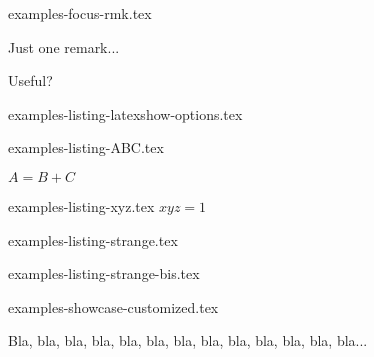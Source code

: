 \begin{filecontents*}[overwrite]{examples-focus-rmk.tex}
\begin{tdocrem}
    Just one remark...
\end{tdocrem}

\begin{tdocrem}
    Useful?
\end{tdocrem}
\end{filecontents*}


\begin{filecontents*}[overwrite]{examples-listing-latexshow-options.tex}
\end{filecontents*}


\begin{filecontents*}[overwrite]{examples-listing-ABC.tex}
\begin{tdoclatex}[sbs]
    $A = B + C$
\end{tdoclatex}
\end{filecontents*}


\begin{filecontents*}[overwrite]{examples-listing-xyz.tex}
$x y z = 1$
\end{filecontents*}


\begin{filecontents*}[overwrite]{examples-listing-strange.tex}
\begin{tdoclatex}
\end{tdoclatex}
\end{filecontents*}


\begin{filecontents*}[overwrite]{examples-listing-strange-bis.tex}
\begin{tdoclatex}
\end{tdoclatex}
\end{filecontents*}


\begin{filecontents*}[overwrite]{examples-showcase-customized.tex}
\begin{tdocshowcase}[before = My beginning,
                     after  = My end,
                     color  = red]
    Bla, bla, bla, bla, bla, bla, bla, bla, bla, bla, bla, bla, bla...
\end{tdocshowcase}
\end{filecontents*}


